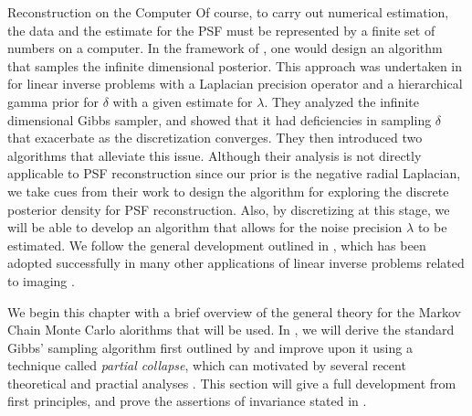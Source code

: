 \begin{chapter}{Reconstruction on the Computer}
Of course, to carry out numerical estimation, the data and the estimate for the PSF must be represented by a finite set of numbers on a computer.
In the framework of \citep{stuart2010}, one would design an algorithm that samples the infinite dimensional posterior. 
This approach was undertaken in \citep{agapiou2014analysis} for linear inverse problems with a Laplacian precision operator and a hierarchical gamma prior for $\delta$ with a given estimate for $\lambda$. 
They analyzed the infinite dimensional Gibbs sampler, and showed that it had deficiencies in sampling $\delta$ that exacerbate as the discretization converges.
They then introduced two algorithms that alleviate this issue.
Although their analysis is not directly applicable to PSF reconstruction since our prior is the negative radial Laplacian, we take cues from their work to design the algorithm for exploring the discrete posterior density for PSF reconstruction.
Also, by discretizing at this stage, we will be able to develop an algorithm that allows for the noise precision $\lambda$ to be estimated.
We follow the general development outlined in \citep{bardsley2012mcmc}, which has been adopted successfully in many other applications of linear inverse problems related to imaging \citep{howard2016bayesian,bardsley2016metropolis,fowler2016stochastic,bardsley2015dealing,bardsley2013efficient}.

We begin this chapter with a brief overview of the general theory for the Markov Chain Monte Carlo alorithms that will be used.
In , we will derive the standard Gibbs' sampling algorithm first outlined by \citep{geman1984stochastic} and improve upon it using a technique called \emph{partial collapse}, which can motivated by several recent theoretical and practial analyses \citep{van2008partially,agapiou2014analysis,fox2015fast}.
This section will give a full development from first principles, and prove the assertions of invariance stated in \citep{van2008partially}.


\end{chapter}
